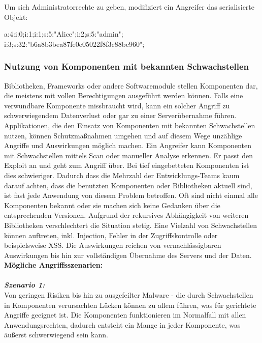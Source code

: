 Um sich Administratorrechte zu geben, modifiziert ein Angreifer das serialisierte Objekt:\\

\begin{LaTeXCode}[caption={Unsichere Deserialisierung - Beispiel 3},captionpos=b, label=LaTeXCode:ud3][numbers=none]
a:4:{i:0;i:1;i:1;s:5:"Alice";i:2;s:5:"admin";
i:3;s:32:"b6a8b3bea87fe0e05022f8f3c88bc960";}
\end{LaTeXCode}

\subsubsection{Nutzung von Komponenten mit bekannten Schwachstellen}

Bibliotheken, Frameworks oder andere Softwaremodule stellen Komponenten dar, die meistens mit vollen Berechtigungen ausgeführt werden können. Falls eine verwundbare Komponente missbraucht wird, kann ein solcher Angriff zu schwerwiegendem Datenverlust oder gar zu einer Serverübernahme führen. Applikationen, die den Einsatz von Komponenten mit bekannten Schwachstellen nutzen, können Schutzmaßnahmen umgehen und auf diesem Wege unzählige Angriffe und Auswirkungen möglich machen\cite[6]{owasp17top10}. Ein Angreifer kann Komponenten mit Schwachstellen mittels Scan oder manueller Analyse erkennen. Er passt den Exploit an und geht zum Angriff über. Bei tief eingebetteten Komponenten ist dies schwieriger. Dadurch dass die Mehrzahl der Entwicklungs-Teams kaum darauf achten, dass die benutzten Komponenten oder Bibliotheken aktuell sind, ist fast jede Anwendung von diesem Problem betroffen. Oft sind nicht einmal alle Komponenten bekannt oder sie machen sich keine Gedanken über die entsprechenden Versionen. Aufgrund der rekursives Abhängigkeit von weiteren Bibliotheken verschlechtert die Situation stetig. Eine Vielzahl von Schwachstellen können auftreten, inkl. Injection, Fehler in der Zugriffskontrolle oder beispielsweise XSS. Die Auswirkungen reichen von vernachlässigbaren Auswirkungen bis hin zur vollständigen Übernahme des Servers und der Daten\cite[15]{owasp17top10}.\\

\textbf{Mögliche Angriffsszenarien:}\\
\\
\textbf{\textit{Szenario 1:}}\\

Von geringen Risiken bis hin zu ausgefeilter Malware - die durch Schwachstellen in Komponenten verursachten Lücken können zu allem führen, was für gerichtete Angriffe geeignet ist. Die Komponenten funktionieren im Normalfall mit allen Anwendungsrechten, dadurch entsteht ein Mange in jeder Komponente, was äußerst schwerwiegend sein kann\cite[15]{owasp17top10}.


